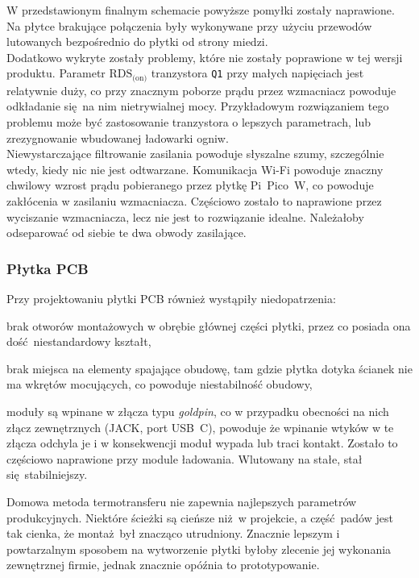 \documentclass[12pt]{report}
\let\tempone\itemize
\let\temptwo\enditemize
\renewenvironment{itemize}{\tempone\setlength{\itemsep}{0cm}}{\temptwo}
\begin{document}
				W przedstawionym finalnym schemacie powyższe pomyłki zostały naprawione. Na płytce brakujące połączenia były wykonywane przy użyciu przewodów lutowanych bezpośrednio do płytki od strony miedzi.
				$ $\\
				
				Dodatkowo wykryte zostały problemy, które nie zostały poprawione w tej wersji produktu. Parametr $\text{RDS}_{\text{(on)}}$ tranzystora \lstinline|Q1| przy małych napięciach jest relatywnie duży, co przy znacznym poborze prądu przez wzmacniacz powoduje odkładanie się na nim nietrywialnej mocy. Przykładowym rozwiązaniem tego problemu może być zastosowanie tranzystora o lepszych parametrach, lub zrezygnowanie wbudowanej ładowarki ogniw.
				$ $\\
				
				Niewystarczające filtrowanie zasilania powoduje słyszalne szumy, szczególnie wtedy, kiedy nic nie jest odtwarzane. Komunikacja Wi-Fi powoduje znaczny chwilowy wzrost prądu pobieranego przez płytkę Pi~Pico~W, co powoduje zakłócenia w zasilaniu wzmacniacza. Częściowo zostało to naprawione przez wyciszanie wzmacniacza, lecz nie jest to rozwiązanie idealne. Należałoby odseparować od siebie te dwa obwody zasilające.
				
			\subsubsection{Płytka PCB}
				Przy projektowaniu płytki PCB również wystąpiły niedopatrzenia:
				\begin{itemize}
					\item brak otworów montażowych w obrębie głównej części płytki, przez co posiada ona dość niestandardowy kształt,
					\item brak miejsca na elementy spajające obudowę, tam gdzie płytka dotyka ścianek nie ma wkrętów mocujących, co powoduje niestabilność obudowy,
					\item moduły są wpinane w złącza typu \textit{goldpin}, co w przypadku obecności na nich złącz zewnętrznych (JACK, port USB~C), powoduje że wpinanie wtyków w te złącza odchyla je i w konsekwencji moduł wypada lub traci kontakt. Zostało to częściowo naprawione przy module ładowania. Wlutowany na stałe, stał się stabilniejszy.
				\end{itemize}
				
				Domowa metoda termotransferu nie zapewnia najlepszych parametrów produkcyjnych. Niektóre ścieżki są cieńsze niż w projekcie, a część padów jest tak cienka, że montaż był znacząco utrudniony. Znacznie lepszym i powtarzalnym sposobem na wytworzenie płytki byłoby zlecenie jej wykonania zewnętrznej firmie, jednak znacznie opóźnia to prototypowanie.
		
\end{document}
